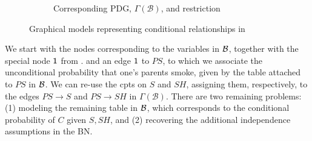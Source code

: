 \documentclass{article}
\newcommand{\MN}{PDG}
\numberwithin{equation}{section}
\begin{document}
\begin{example}[emulating a BN]
\begin{figure*}[ht!]
\begin{subfigure}[b]{0.5\textwidth}
{}
				\caption{Corresponding \MN, $\Gamma(\mathcal B)$, and restriction}
				\label{subfig:smoking-pdg}
			\end{subfigure}
		
			\caption{Graphical models representing conditional relationships in }
			\label{fig:smoking-bn+pdg}
		\end{figure*}
		
%

We start with the nodes corresponding to the variables in $\cal B$,
together with the 
special node $\sf 1$ from . and
an edge ${\sf 1}$ to $\mathit{PS}$, to which we associate the
unconditional probability that one's parents smoke, given by the table
attached to $\mathit{PS}$ in $\cal B$. 
We can re-use the cpts on $S$ and
                $\mathit{SH}$, assigning them, respectively, to the
                edges $PS \to S$ and $PS \to SH$ in $\Gamma(\mathcal
                B)$. There are two remaining problems: (1) modeling
                the remaining table in $\cal B$, which corresponds to
                the conditional probability of $C$ given $S,SH$, and
                (2) recovering the additional independence assumptions
                in the BN. 


\end{example}
\end{document}

